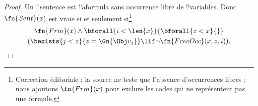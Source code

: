\documentclass[../../../include/open-logic-section]{subfiles}
\begin{document}
\begin{proof}
Un !!{sentence} est !!a{formula} sans occurrence libre de
!!{variable}s. Donc $\fn{Sent}(x)$ est vraie si et seulement si\footnote{Correction éditoriale : la source ne teste que l'absence d'occurrences libres ; nous ajoutons $\fn{Frm}(x)$ pour exclure les codes qui ne représentent pas une formule.}
\begin{multline*}
\fn{Frm}(x)\land\bforall{i<\len{x}}{\bforall{z<x}{}}\\
(\bexists{j<z}{z=\Gn{\Obj v_j}} \lif \lnot\fn{FreeOcc}(x,z,i)).
\end{multline*}
\end{proof}
\end{document}
